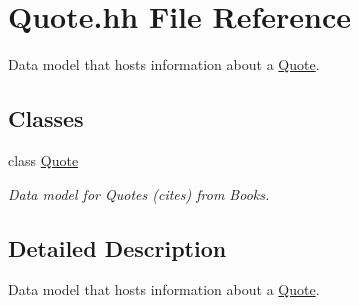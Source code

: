 \hypertarget{_quote_8hh}{}\section{Quote.\+hh File Reference}
\label{_quote_8hh}


Data model that hosts information about a \hyperlink{class_quote}{Quote}.  


\subsection*{Classes}
\begin{DoxyCompactItemize}
\item 
class \hyperlink{class_quote}{Quote}
\begin{DoxyCompactList}\small\item\em Data model for Quotes (cites) from Books. \end{DoxyCompactList}\end{DoxyCompactItemize}


\subsection{Detailed Description}
Data model that hosts information about a \hyperlink{class_quote}{Quote}. 

